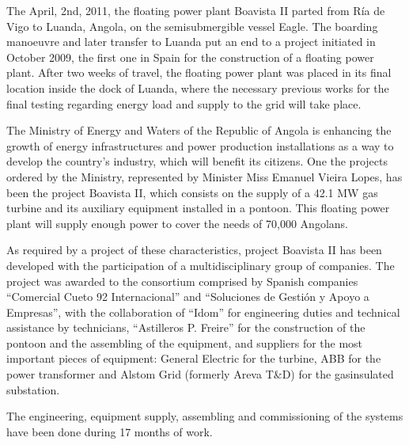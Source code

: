 \begin{minipage}[c]{.55\linewidth}
\cappar The April, 2nd, 2011, the floating power plant Boavista II
parted from Ría de Vigo to Luanda, Angola, on the semisubmergible
vessel Eagle. The boarding manoeuvre and later
transfer to Luanda put an end to a project initiated in October
2009, the first one in Spain for the construction of a floating power
plant. After two weeks of travel, the floating power plant was placed
in its final location inside the dock of Luanda, where the necessary
previous works for the final testing regarding energy load
and supply to the grid will take place.

\vspace{1cm}

The Ministry of Energy and Waters of the Republic of Angola is
enhancing the growth of energy infrastructures and power
production installations as a way to develop the country’s
industry, which will benefit its citizens. One the projects ordered
by the Ministry, represented by Minister Miss Emanuel Vieira
Lopes, has been the project Boavista II, which consists on the
supply of a 42.1 MW gas turbine and its auxiliary equipment
installed in a pontoon. This floating power plant will supply
enough power to cover the needs of 70,000 Angolans.

\vspace{1cm}

As required by a project of these characteristics, project Boavista
II has been developed with the participation of a
multidisciplinary group of companies. The project was awarded
to the consortium comprised by Spanish companies “Comercial
Cueto 92 Internacional” and “Soluciones de Gestión y Apoyo a
Empresas”, with the collaboration of “Idom” for engineering
duties and technical assistance by technicians, “Astilleros P.
Freire” for the construction of the pontoon and the assembling of
the equipment, and suppliers for the most important pieces of
equipment: General Electric for the turbine, ABB for the power
transformer and Alstom Grid (formerly Areva T\&D) for the gasinsulated
substation.

\vspace{1cm}

The engineering, equipment supply, assembling and
commissioning of the systems have been done during 17 months
of work.

\end{minipage}

\newpage

